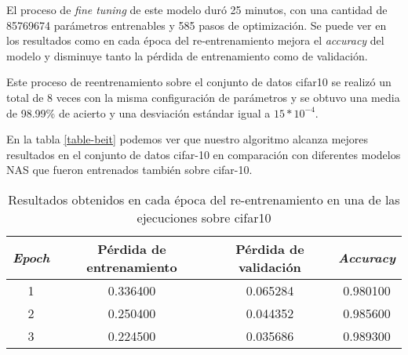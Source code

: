 El proceso de \textit{fine tuning} de este modelo duró 25 minutos, con una cantidad de 85769674 parámetros entrenables y 585 pasos de optimización. Se puede ver en los resultados como en cada época del re-entrenamiento mejora el \textit{accuracy} del modelo y disminuye tanto la pérdida de entrenamiento como de validación.

Este proceso de reentrenamiento sobre el conjunto de datos cifar10 se realizó un total de 8 veces con la misma configuración de parámetros y se obtuvo una media de 98.99\% de acierto y una desviación estándar igual a $15*10^{-4}$.

En la tabla \ref{table-beit} podemos ver que nuestro algoritmo alcanza mejores resultados en el conjunto de datos cifar-10 en comparación con diferentes modelos NAS que fueron entrenados también sobre cifar-10.

\begin{table}[h!]
  \centering
  \begin{tabular}{||c c c c||} 
      \hline
      \textit{Epoch} & Pérdida de entrenamiento & Pérdida de validación & \textit{Accuracy} \\ [0.5ex] 
      \hline
      1 & 0.336400 & 0.065284 & 0.980100 \\ 
      \hline
      2 & 0.250400 & 0.044352 & 0.985600 \\ 
      \hline
      3 & 0.224500 & 0.035686 & 0.989300 \\ [1ex] 
      \hline
  \end{tabular}
  \caption{Resultados obtenidos en cada época del re-entrenamiento en una de las ejecuciones sobre cifar10}
  \label{table:2}
\end{table}

\begin{table}[h!]
  \centering
  \caption{Resultados de diferentes algoritmos NAS comparado con el algoritmo para clasificación de imágenes integrado a AutoGoal, todos evaluados en el conjunto de datos cifar-10.}
  \label{table-beit}
  \end{table}

